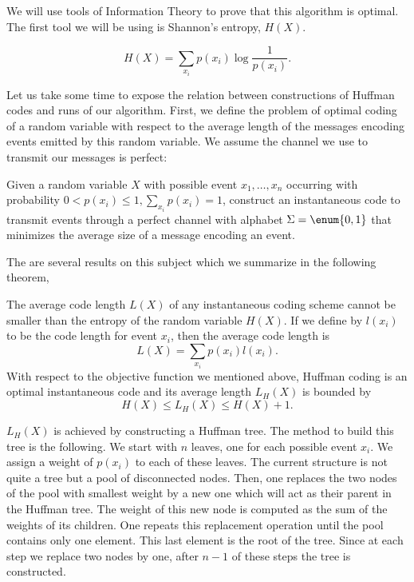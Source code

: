 We will use tools of Information Theory to prove that this algorithm is
optimal. The first tool we will be using is Shannon's entropy, \(H(X)\).
\begin{theorem}
\begin{displaymath}
H(X) = \sum_{x_i} p(x_i) \log \frac{1}{p(x_i)}.
\end{displaymath}
\end{theorem}

Let us take some time to expose the relation between constructions of Huffman
codes and runs of our algorithm. First, we define the problem of optimal
coding of a random variable with respect to the average length of the messages
encoding events emitted by this random variable. We assume the channel we
use to transmit our messages is perfect:

\begin{problem}
Given a random variable \(X\) with possible event \(x_1,\ldots,x_n\) occurring
with probability \(0 < p(x_i) \le 1, \sum_{x_i} p(x_i) = 1\), construct an
instantaneous code to transmit events through a perfect channel with alphabet
\(\Sigma = \enum{0,1}\) that minimizes the average size of a message encoding
an event.
\end{problem}

The are several results on this subject which we summarize in the
following theorem,

\begin{theorem}
The average code length \(L(X)\) of any instantaneous coding scheme cannot be smaller than
the entropy of the random variable \(H(X)\). If we define by \(l(x_i)\) to be the code
length for event \(x_i\), then the average code length is
\begin{displaymath}
L(X) = \sum_{x_i} p(x_i) l(x_i).
\end{displaymath}
With respect to the objective function we mentioned above, Huffman coding is
an optimal instantaneous code and its average length \(L_H(X)\) is bounded by
\begin{displaymath}
H(X) \le L_H(X) \le H(X) + 1.
\end{displaymath}
\end{theorem}

\(L_H(X)\) is achieved by constructing a Huffman tree. The method to build this
tree is the following. We start with \(n\) leaves, one for each possible event
\(x_i\). We assign a weight of \(p(x_i)\) to each of these leaves. The current
structure is not quite a tree but a pool of disconnected nodes.  Then, one
replaces the two nodes of the pool with smallest weight by a new one which will
act as their parent in the Huffman tree. The weight of this new node is
computed as the sum of the weights of its children. One repeats this
replacement operation until the pool contains only one element. This last
element is the root of the tree. Since at each step we replace two nodes by
one, after \(n-1\) of these steps the tree is constructed.

